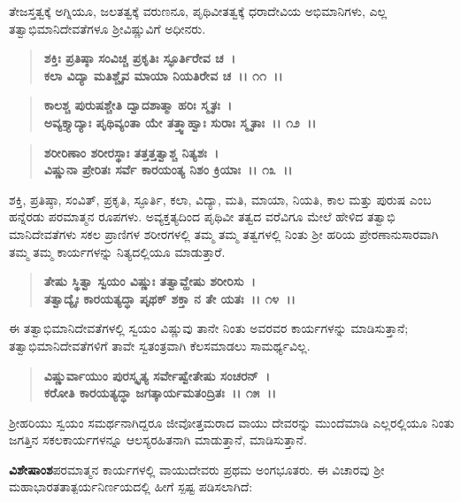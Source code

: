 ತೇಜಸ್ತತ್ವಕ್ಕೆ ಅಗ್ನಿಯೂ, ಜಲತತ್ವಕ್ಕೆ ವರುಣನೂ, ಪೃಥಿವೀತತ್ವಕ್ಕೆ ಧರಾದೇವಿಯ ಅಭಿಮಾನಿಗಳು, ಎಲ್ಲ ತತ್ವಾಭಿಮಾನಿದೇವತೆಗಳೂ ಶ‍್ರೀವಿಷ್ಣುವಿಗೆ ಅಧೀನರು.

\begin{verse}
\textbf{ಶಕ್ತಿಃ ಪ್ರತಿಷ್ಠಾ ಸಂವಿಚ್ಚ ಪ್ರಕೃತಿಃ ಸ್ಫೂರ್ತಿರೇವ ಚ~।}\\\textbf{ಕಲಾ ವಿದ್ಯಾ ಮತಿಶ್ಚೈವ ಮಾಯಾ ನಿಯತಿರೇವ ಚ~।। ೧೧~।। }
\end{verse}

\begin{verse}
\textbf{ಕಾಲಶ್ಚ ಪುರುಷಶ್ಚೇತಿ ದ್ವಾದಶಾತ್ಮಾ ಹರಿಃ ಸ್ಮೃತಃ~।}\\\textbf{ಅವ್ಯಕ್ತ್ಯಾದ್ಯಾಃ ಪೃಥಿವ್ಯಂತಾ ಯೇ ತತ್ತ್ವಾಹ್ವಾಃ ಸುರಾಃ ಸ್ಮೃತಾಃ~।। ೧೨~।।}
\end{verse}

\begin{verse}
\textbf{ಶರೀರಿಣಾಂ ಶರೀರಸ್ಥಾಃ ತತ್ತತ್ತತ್ವಾಶ್ಚ ನಿತ್ಯಶಃ~।}\\\textbf{ವಿಷ್ಣುನಾ ಪ್ರೇರಿತಃ ಸರ್ವೆ ಕಾರಯಂತ್ಯ ನಿಶಂ ಕ್ರಿಯಾಃ~।। ೧೩~।।}
\end{verse}

ಶಕ್ತಿ, ಪ್ರತಿಷ್ಠಾ, ಸಂವಿತ್, ಪ್ರಕೃತಿ, ಸ್ಫೂರ್ತಿ, ಕಲಾ, ವಿದ್ಯಾ, ಮತಿ, ಮಾಯಾ, ನಿಯತಿ, ಕಾಲ ಮತ್ತು ಪುರುಷ ಎಂಬ ಹನ್ನೆರಡು ಪರಮಾತ್ಮನ ರೂಪಗಳು. ಅವ್ಯಕ್ತತ್ಯದಿಂದ ಪೃಥಿವೀ ತತ್ವದ ವರೆವಿಗೂ ಮೇಲೆ ಹೇಳಿದ ತತ್ವಾಭಿ ಮಾನಿದೇವತೆಗಳು ಸಕಲ ಪ್ರಾಣಿಗಳ ಶರೀರಗಳಲ್ಲಿ ತಮ್ಮ ತಮ್ಮ ತತ್ವಗಳಲ್ಲಿ ನಿಂತು ಶ‍್ರೀ ಹರಿಯ ಪ್ರೇರಣಾನುಸಾರವಾಗಿ ತಮ್ಮ ತಮ್ಮ ಕಾರ್ಯಗಳನ್ನು ನಿತ್ಯದಲ್ಲಿಯೂ ಮಾಡುತ್ತಾರೆ.

\begin{verse}
\textbf{ತೇಷು ಸ್ಥಿತ್ವಾ ಸ್ವಯಂ ವಿಷ್ಣುಃ ತತ್ವಾವ್ಹೇಷು ಶರೀರಿಸು~।}\\\textbf{ತತ್ವಾದ್ಯೈಃ ಕಾರಯತ್ಯದ್ಧಾ ಪೃಥಕ್ ಶಕ್ತಾ ನ ತೇ ಯತಃ~।। ೧೪~।।}
\end{verse}

ಈ ತತ್ವಾಭಿಮಾನಿದೇವತೆಗಳಲ್ಲಿ ಸ್ವಯಂ ವಿಷ್ಣುವು ತಾನೇ ನಿಂತು ಅವರವರ ಕಾರ್ಯಗಳನ್ನು ಮಾಡಿಸುತ್ತಾನೆ; ತತ್ವಾಭಿಮಾನಿದೇವತೆಗಳಿಗೆ ತಾವೇ ಸ್ವತಂತ್ರವಾಗಿ ಕೆಲಸಮಾಡಲು ಸಾಮರ್ಥ್ಯವಿಲ್ಲ.

\begin{verse}
\textbf{ವಿಷ್ಣುರ್ವಾಯುಂ ಪುರಸ್ಕೃತ್ಯ ಸರ್ವೇಷ್ವೇತೇಷು ಸಂಚರನ್~।}\\\textbf{ಕರೋತಿ ಕಾರಯತ್ಯದ್ಧಾ ಜಗತ್ಕಾರ್ಯಮತಂದ್ರಿತಃ~।। ೧೫~।।}
\end{verse}

ಶ‍್ರೀಹರಿಯು ಸ್ವಯಂ ಸಮರ್ಥನಾಗಿದ್ದರೂ ಜೀವೋತ್ತಮರಾದ ವಾಯು ದೇವರನ್ನು ಮುಂದೆಮಾಡಿ ಎಲ್ಲರಲ್ಲಿಯೂ ನಿಂತು ಜಗತ್ತಿನ ಸಕಲಕಾರ್ಯಗಳನ್ನೂ ಆಲಸ್ಯರಹಿತನಾಗಿ ಮಾಡುತ್ತಾನೆ, ಮಾಡಿಸುತ್ತಾನೆ.

\textbf{ವಿಶೇಷಾಂಶ\enginline{-}}ಪರಮಾತ್ಮನ ಕಾರ್ಯಗಳಲ್ಲಿ ವಾಯುದೇವರು ಪ್ರಥಮ ಅಂಗಭೂತರು. ಈ ವಿಚಾರವು ಶ‍್ರೀ ಮಹಾಭಾರತತಾತ್ಪರ್ಯನಿರ್ಣಯದಲ್ಲಿ ಹೀಗೆ ಸ್ಪಷ್ಟ ಪಡಿಸಲಾಗಿದೆ:

